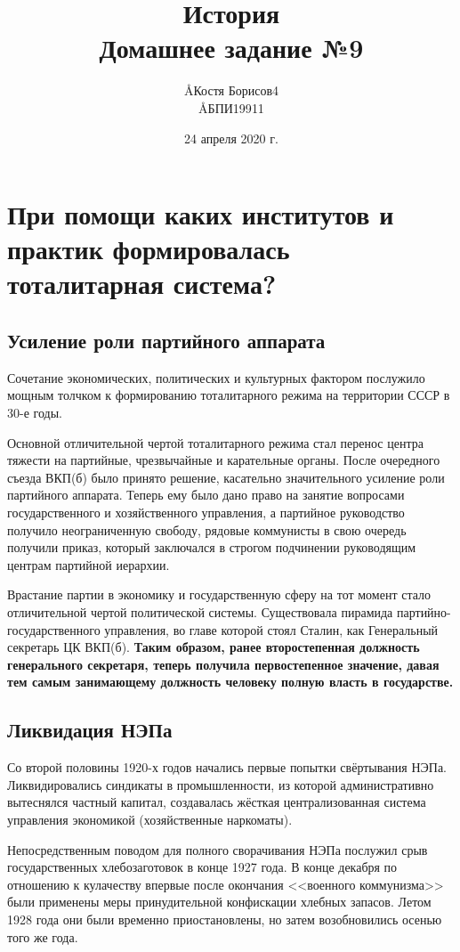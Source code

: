 \documentclass[12pt]{article}
\title{История \\ Домашнее задание №9}
\author{\AA{Костя Борисов}{4} \\ \AA{БПИ199}{11}}
\date{24 апреля 2020 г.}
\begin{document}
  \maketitle

  \setcounter{section}{2}
  \section{При помощи каких институтов и практик формировалась тоталитарная система?}
  \subsection{Усиление роли партийного аппарата}
  Сочетание экономических, политических и культурных фактором послужило мощным толчком к формированию тоталитарного режима на территории СССР в 30-е годы.

  Основной отличительной чертой тоталитарного режима стал перенос центра тяжести на партийные, чрезвычайные и карательные органы.
  После очередного съезда ВКП(б) было принято решение, касательно значительного усиление роли партийного аппарата.
  Теперь ему было дано право на занятие вопросами государственного и хозяйственного управления, а партийное руководство получило неограниченную свободу, рядовые коммунисты в свою очередь получили приказ, который заключался в строгом подчинении руководящим центрам партийной иерархии.

  Врастание партии в экономику и государственную сферу на тот момент стало отличительной чертой политической системы.
  Существовала пирамида партийно-государственного управления, во главе которой стоял Сталин, как Генеральный секретарь ЦК ВКП(б).
  \textbf{Таким образом, ранее второстепенная должность генерального секретаря, теперь получила первостепенное значение,
  давая тем самым занимающему должность человеку полную власть в государстве.}

  \subsection{Ликвидация НЭПа}
  Со второй половины 1920-х годов начались первые попытки свёртывания НЭПа.
  Ликвидировались синдикаты в промышленности, из которой административно вытеснялся частный капитал,
  создавалась жёсткая централизованная система управления экономикой (хозяйственные наркоматы).

  Непосредственным поводом для полного сворачивания НЭПа послужил срыв государственных хлебозаготовок в конце 1927 года.
  В конце декабря по отношению к кулачеству впервые после окончания <<военного коммунизма>> были применены меры принудительной конфискации хлебных запасов.
  Летом 1928 года они были временно приостановлены, но затем возобновились осенью того же года.
\end{document}
